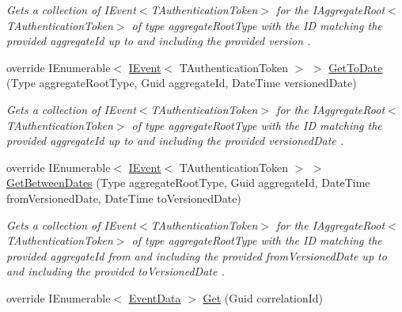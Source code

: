 \begin{DoxyCompactItemize}
\begin{DoxyCompactList}\small\item\em Gets a collection of I\+Event$<$\+T\+Authentication\+Token$>$ for the I\+Aggregate\+Root$<$\+T\+Authentication\+Token$>$ of type {\itshape aggregate\+Root\+Type}  with the ID matching the provided {\itshape aggregate\+Id}  up to and including the provided {\itshape version} . \end{DoxyCompactList}\item 
override I\+Enumerable$<$ \hyperlink{interfaceCqrs_1_1Events_1_1IEvent}{I\+Event}$<$ T\+Authentication\+Token $>$ $>$ \hyperlink{classCqrs_1_1Azure_1_1DocumentDb_1_1Events_1_1AzureDocumentDbEventStore_ad81c8ea571d926f3d8453bca7ce6a647_ad81c8ea571d926f3d8453bca7ce6a647}{Get\+To\+Date} (Type aggregate\+Root\+Type, Guid aggregate\+Id, Date\+Time versioned\+Date)
\begin{DoxyCompactList}\small\item\em Gets a collection of I\+Event$<$\+T\+Authentication\+Token$>$ for the I\+Aggregate\+Root$<$\+T\+Authentication\+Token$>$ of type {\itshape aggregate\+Root\+Type}  with the ID matching the provided {\itshape aggregate\+Id}  up to and including the provided {\itshape versioned\+Date} . \end{DoxyCompactList}\item 
override I\+Enumerable$<$ \hyperlink{interfaceCqrs_1_1Events_1_1IEvent}{I\+Event}$<$ T\+Authentication\+Token $>$ $>$ \hyperlink{classCqrs_1_1Azure_1_1DocumentDb_1_1Events_1_1AzureDocumentDbEventStore_aae5f14188f0486b70dc9cdb577b15e1c_aae5f14188f0486b70dc9cdb577b15e1c}{Get\+Between\+Dates} (Type aggregate\+Root\+Type, Guid aggregate\+Id, Date\+Time from\+Versioned\+Date, Date\+Time to\+Versioned\+Date)
\begin{DoxyCompactList}\small\item\em Gets a collection of I\+Event$<$\+T\+Authentication\+Token$>$ for the I\+Aggregate\+Root$<$\+T\+Authentication\+Token$>$ of type {\itshape aggregate\+Root\+Type}  with the ID matching the provided {\itshape aggregate\+Id}  from and including the provided {\itshape from\+Versioned\+Date}  up to and including the provided {\itshape to\+Versioned\+Date} . \end{DoxyCompactList}\item 
override I\+Enumerable$<$ \hyperlink{classCqrs_1_1Events_1_1EventData}{Event\+Data} $>$ \hyperlink{classCqrs_1_1Azure_1_1DocumentDb_1_1Events_1_1AzureDocumentDbEventStore_ac59ce599b768ce047869b8ac135f4e22_ac59ce599b768ce047869b8ac135f4e22}{Get} (Guid correlation\+Id)

\end{DoxyCompactItemize}
